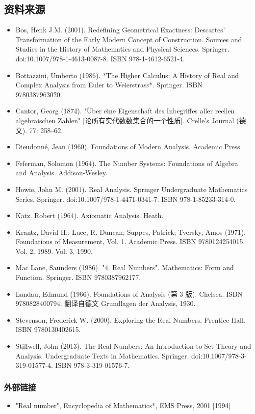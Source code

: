 \subsection{资料来源}
\begin{itemize}
\item Bos, Henk J.M. (2001). Redefining Geometrical Exactness: Descartes' Transformation of the Early Modern Concept of Construction. Sources and Studies in the History of Mathematics and Physical Sciences. Springer. doi:10.1007/978-1-4613-0087-8. ISBN 978-1-4612-6521-4.
\item Bottazzini, Umberto (1986). *The Higher Calculus: A History of Real and Complex Analysis from Euler to Weierstrass*. Springer. ISBN 9780387963020.
\item Cantor, Georg (1874). "Über eine Eigenschaft des Inbegriffes aller reellen algebraischen Zahlen" [论所有实代数数集合的一个性质]. Crelle's Journal (德文). 77: 258–62.
\item Dieudonné, Jean (1960). Foundations of Modern Analysis. Academic Press.
\item Feferman, Solomon (1964). The Number Systems: Foundations of Algebra and Analysis. Addison-Wesley.
\item  Howie, John M. (2001). Real Analysis. Springer Undergraduate Mathematics Series. Springer. doi:10.1007/978-1-4471-0341-7. ISBN 978-1-85233-314-0.
\item Katz, Robert (1964). Axiomatic Analysis. Heath.
\item Krantz, David H.; Luce, R. Duncan; Suppes, Patrick; Tversky, Amos (1971). Foundations of Measurement, Vol. 1. Academic Press. ISBN 9780124254015. Vol. 2, 1989. Vol. 3, 1990.
\item Mac Lane, Saunders (1986). "4. Real Numbers". Mathematics: Form and Function. Springer. ISBN 9780387962177.
\item Landau, Edmund (1966). Foundations of Analysis (第 3 版). Chelsea. ISBN 9780828400794. 翻译自德文 Grundlagen der Analysis, 1930.
\item Stevenson, Frederick W. (2000). Exploring the Real Numbers. Prentice Hall. ISBN 9780130402615.
\item Stillwell, John (2013). The Real Numbers: An Introduction to Set Theory and Analysis. Undergraduate Texts in Mathematics. Springer. doi:10.1007/978-3-319-01577-4. ISBN 978-3-319-01576-7.
\end{itemize}

\subsubsection{外部链接}
\begin{itemize}
\item "Real number", Encyclopedia of Mathematics*, EMS Press, 2001 [1994]
\end{itemize}
